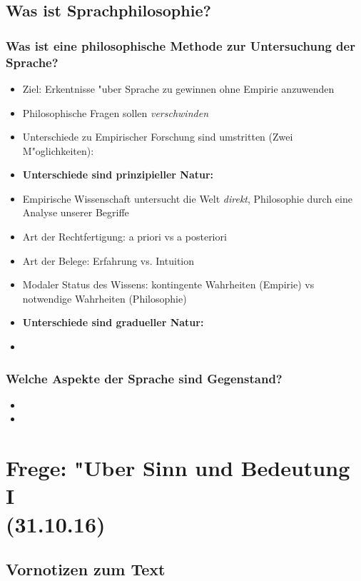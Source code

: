 \documentclass[]{scrartcl}
\begin{document}
\subsection{Was ist Sprachphilosophie?}
\subsubsection{Was ist eine philosophische Methode zur Untersuchung der Sprache?}
\begin{itemize}
  \item Ziel: Erkentnisse "uber Sprache zu gewinnen ohne Empirie anzuwenden
  \item Philosophische Fragen sollen \emph{verschwinden}
  \item Unterschiede zu Empirischer Forschung sind umstritten (Zwei M"oglichkeiten):
  \item \textbf{Unterschiede sind prinzipieller Natur:}
  \item Empirische Wissenschaft untersucht die Welt \emph{direkt}, Philosophie durch eine Analyse unserer Begriffe
  \item Art der Rechtfertigung: a priori vs a posteriori
  \item Art der Belege: Erfahrung vs. Intuition
  \item Modaler Status des Wissens: kontingente Wahrheiten (Empirie) vs notwendige Wahrheiten (Philosophie)
  \item \textbf{Unterschiede sind gradueller Natur:}
  \item 
\end{itemize}

\subsubsection{Welche Aspekte der Sprache sind Gegenstand?}

\begin{itemize}
  \item
  \item
\end{itemize}

\newpage



\section{Frege: "Uber Sinn und Bedeutung I\\(31.10.16)}

\subsection{Vornotizen zum Text}
\end{document}
